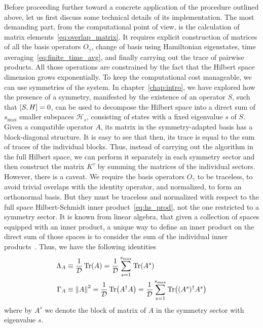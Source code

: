 Before proceeding further toward a concrete application of the procedure outlined above, let us first discuss
some technical details of its implementation. The most demanding part, from the computational point of view,
is the calculation of matrix elements~\eqref{eq:overlap_matrix}. It requires explicit construction of
matrices of all the basis operators \(O_{\gamma}\), change of basis using Hamiltonian eigenstates,
time averaging~\eqref{eq:finite_time_avg}, and finally carrying out the trace of pairwise products.
All those operations are constrained by the fact that the Hilbert space dimension grows exponentially.
To keep the computational cost manageable, we can use symmetries of the system. In chapter~\ref{chap:intro}, we
have explored how the presence of a symmetry, manifested by the existence of an operator \(S\), such
that \(\comm{S}{H} = 0\), can be used to decompose the Hilbert space into a direct sum of \(s_{\text{max}}\) smaller
subspaces \(\mathcal{H}_{s}\), consisting of states with a fixed eigenvalue \(s\) of \(S\). Given a
compatible operator \(A\), its matrix in the symmetry-adapted basis has a block-diagonal structure.
It is easy to see that then, its trace is equal to the sum of traces of the individual blocks.
Thus, instead of carrying out the algorithm in the full Hilbert space, we can perform it separately
in each symmetry sector and then construct the matrix \(K^{\tau}\) by summing the matrices of the
individual sectors. However, there is a caveat. We require the basis operators \(O_{\gamma}\) to be
traceless, to avoid trivial overlaps with the identity operator, and normalized, to form an orthonormal
basis. But they must be traceless and normalized with respect to the full space Hilbert-Schmidt inner
product~\eqref{eq:hs_prod}, not the one restricted to a symmetry sector. It is known from linear algebra,
that given a collection of spaces equipped with an inner product, a unique way to define an inner product
on the direct sum of those spaces is to consider the sum of the individual inner products~\autocite{Conway2007}.
Thus, we have the following identities
\begin{align}
  \Lambda_A & \equiv \frac{1}{\mathcal{D}} \Tr(A) = \frac{1}{\mathcal{D}} \sum_{s=1}^{s_{\text{max}}} \Tr(A^s)                                  \\
  \Gamma_A  & \equiv \norm{A}^2 = \frac{1}{\mathcal{D}} \Tr(A^{\dag}A) = \frac{1}{\mathcal{D}} \sum_{s=1}^{s_{\text{max}}} \Tr((A^s)^{\dag}A^s)
\end{align}
where by \(A^s\) we denote the block of matrix of \(A\) in the symmetry sector with eigenvalue \(s\).
